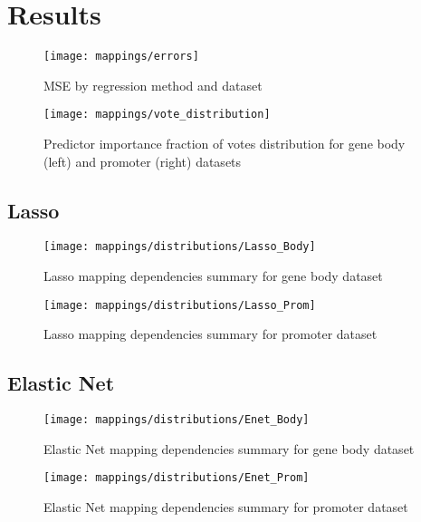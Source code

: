 \section{Results}


\begin{figure}[H]
	\centering
	\texttt{[image: mappings/errors]}
	\caption{MSE by regression method and dataset}
	\label{fig:map_errors}
\end{figure}

\pagebreak

\begin{figure}[H]
	\centering
	\texttt{[image: mappings/vote\_distribution]}
	\caption{Predictor importance fraction of votes distribution for gene body (left) and promoter (right) datasets}
	\label{fig:map_vote_dist}
\end{figure}


\pagebreak
\subsection{Lasso}

\begin{figure}[H]
	\centering
	\texttt{[image: mappings/distributions/Lasso\_Body]}
	\caption{Lasso mapping dependencies summary for gene body dataset}
	\label{fig:map_body_lasso}
\end{figure}

\begin{figure}[H]
	\centering
	\texttt{[image: mappings/distributions/Lasso\_Prom]}
	\caption{Lasso mapping dependencies summary for promoter dataset}
	\label{fig:map_prom_lasso}
\end{figure}


\pagebreak
\subsection{Elastic Net}

\begin{figure}[H]
	\centering
	\texttt{[image: mappings/distributions/Enet\_Body]}
	\caption{Elastic Net mapping dependencies summary for gene body dataset}
	\label{fig:map_body_enet}
\end{figure}

\begin{figure}[H]
	\centering
	\texttt{[image: mappings/distributions/Enet\_Prom]}
	\caption{Elastic Net mapping dependencies summary for promoter dataset}
	\label{fig:map_prom_enet}
\end{figure}


